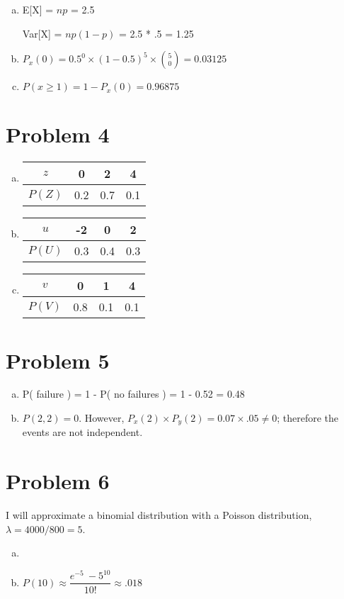 \documentclass[11pt]{article}
\begin{document}
\begin{enumerate}[(a)]
	\item E[X] = $np$ = 2.5
	
			Var[X] = $np(1-p)$ = 2.5 * .5 = 1.25
	\item $P_x(0) = 0.5^0 \times (1-0.5)^5 \times \binom{5}{0}	 = 0.03125$
	
	\item $P( x \geq 1  ) = 1 - P_x(0) = 0.96875$
	
\end{enumerate}

\section*{Problem 4}

\begin{enumerate}[(a)]
	\item 
		\begin{tabular}{ |c || c | c | c|}
			\hline
			$z$ & 0 & 2 & 4 \\
			\hline
			$P(Z)$ & 0.2 & 0.7 & 0.1 \\
			\hline
		\end{tabular}
		
	\item 
		\begin{tabular}{ |c || c | c | c|}
			\hline
			$u$ & -2 & 0 & 2 \\
			\hline
			$P(U)$ & 0.3 & 0.4 & 0.3 \\
			\hline
		\end{tabular}
		
	\item 
		\begin{tabular}{ |c || c | c | c|}
			\hline
			$v$ & 0 & 1 & 4 \\
			\hline
			$P(V)$ & 0.8 & 0.1 & 0.1 \\
			\hline
		\end{tabular}
\end{enumerate}




\section*{Problem 5}

\begin{enumerate}[(a)]
	\item P( failure ) = 1 - P( no failures ) = 1 - 0.52 = 0.48
	\item $P(2, 2) = 0$. However, $P_x(2) \times P_y(2) = 0.07 \times .05 \neq 0$; therefore the events are not independent.
\end{enumerate}


\section*{Problem 6}
I will approximate a binomial distribution with a Poisson distribution, $\lambda = 4000/800 = 5$.

\begin{enumerate}[(a)]
	\item 
	\item $P(10) \approx \dfrac{e^{-5}\ -5^{10}}{10!} \approx .018$
\end{enumerate}
\end{document}
